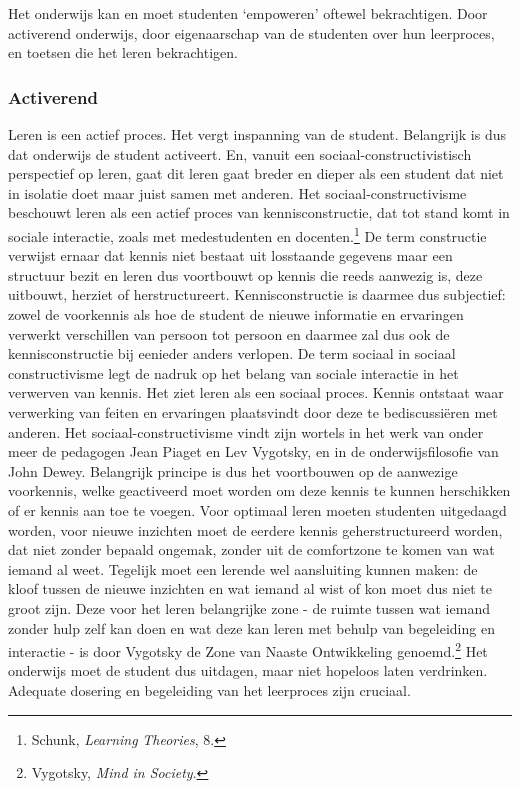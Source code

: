 \documentclass[smallauthor, chapterhaspagenum, nochapterinheader, pagenuminheader,  bigchapnum,medium2, tocpages, garamond, titleinheader]{jote-book}
\begin{document}
	Het onderwijs kan en moet studenten ‘empoweren' oftewel bekrachtigen. Door activerend onderwijs, door eigenaarschap van de studenten over hun leerproces, en toetsen die het leren bekrachtigen.



	\subsubsection{Activerend}



	Leren is een actief proces. Het vergt inspanning van de student. Belangrijk is dus dat onderwijs de student activeert. En, vanuit een sociaal-constructivistisch perspectief op leren, gaat dit leren gaat breder en dieper als een student dat niet in isolatie doet maar juist samen met anderen. Het sociaal-constructivisme beschouwt leren als een actief proces van kennisconstructie, dat tot stand komt in sociale interactie, zoals met medestudenten en docenten.\footnote{Schunk, \emph{Learning }\emph{Theories},\emph{ }8.} De term constructie verwijst ernaar dat kennis niet bestaat uit losstaande gegevens maar een structuur bezit en leren dus voortbouwt op kennis die reeds aanwezig is, deze uitbouwt, herziet of herstructureert. Kennisconstructie is daarmee dus subjectief: zowel de voorkennis als hoe de student de nieuwe informatie en ervaringen verwerkt verschillen van persoon tot persoon en daarmee zal dus ook de kennisconstructie bij eenieder anders verlopen. De term sociaal in sociaal constructivisme legt de nadruk op het belang van sociale interactie in het verwerven van kennis. Het ziet leren als een sociaal proces. Kennis ontstaat waar verwerking van feiten en ervaringen plaatsvindt door deze te bediscussiëren met anderen. Het sociaal-constructivisme vindt zijn wortels in het werk van onder meer de pedagogen Jean Piaget en Lev Vygotsky, en in de onderwijsfilosofie van John Dewey. Belangrijk principe is dus het voortbouwen op de aanwezige voorkennis, welke geactiveerd moet worden om deze kennis te kunnen herschikken of er kennis aan toe te voegen. Voor optimaal leren moeten studenten uitgedaagd worden, voor nieuwe inzichten moet de eerdere kennis geherstructureerd worden, dat niet zonder bepaald ongemak, zonder uit de comfortzone te komen van wat iemand al weet. Tegelijk moet een lerende wel aansluiting kunnen maken: de kloof tussen de nieuwe inzichten en wat iemand al wist of kon moet dus niet te groot zijn. Deze voor het leren belangrijke zone - de ruimte tussen wat iemand zonder hulp zelf kan doen en wat deze kan leren met behulp van begeleiding en interactie - is door Vygotsky de Zone van Naaste Ontwikkeling genoemd.\footnote{Vygotsky, \emph{Mind in Society}.} Het onderwijs moet de student dus uitdagen, maar niet hopeloos laten verdrinken. Adequate dosering en begeleiding van het leerproces zijn cruciaal.
\end{document}
